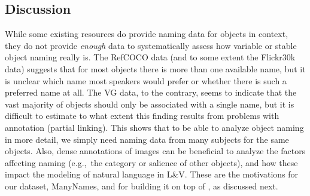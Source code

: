 
\subsection{Discussion}

While some existing resources do provide naming data for objects in context, they do not provide \textit{enough} data to systematically assess how variable or stable object naming really is. The RefCOCO data (and to some extent the Flickr30k data) suggests that for most objects there is more than one available name, but it is unclear which name most speakers would prefer or whether there is such a preferred name at all. 
The VG data, to the contrary, seems to indicate that the vast majority of objects should only be associated with a single name, but it is difficult to estimate to what extent this finding results from problems with annotation (partial linking).
This shows that to be able to analyze object naming in more detail, we simply need naming data from many subjects for the same objects. 
Also, dense annotations of images can be beneficial to analyze the factors affecting naming (e.g.,\ the category or salience of other objects), and how these impact the modeling of natural language in L\&V.
These are the motivations for our dataset, ManyNames, and for building it on top of \vg, as discussed next.

